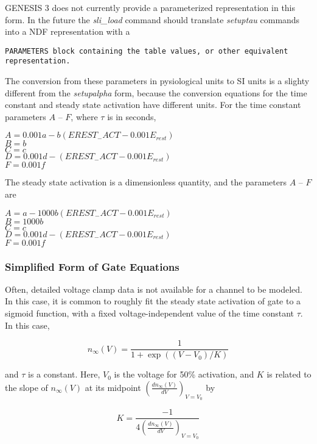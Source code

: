 \documentclass[12pt]{article}
\begin{document}
GENESIS 3 does not currently provide a parameterized representation in
this form.  In the future the {\em sli\_load} command should  translate
{\em setuptau} commands into a NDF representation with a {\tt PARAMETERS
block containing the table values, or other equivalent representation.

The conversion from these parameters in pysiological units to SI units
is a slighty different from the {\em setupalpha} form, because the
conversion equations for the time constant and steady state activation
have different units.   For the time constant parameters $A$ -- $F$,
where $\tau$ is in seconds,

$A = 0.001 a - b (EREST_{-}ACT - 0.001 E_{rest})$ \\
$B = b$ \\
$C = c$ \\
$D = 0.001 d - (EREST_{-}ACT - 0.001 E_{rest})$ \\
$F = 0.001 f$

The steady state activation is a dimensionless quantity, and the
parameters $A$ -- $F$ are

$A = a - 1000 b (EREST_{-}ACT - 0.001 E_{rest})$ \\
$B = 1000 b$ \\
$C = c$ \\
$D = 0.001 d - (EREST_{-}ACT - 0.001 E_{rest})$ \\
$F = 0.001 f$

\subsubsection{Simplified Form of Gate Equations}

Often, detailed voltage clamp data is not available for a channel to be
modeled.  In this case, it is common to roughly fit the steady state
activation of gate to a sigmoid function, with a fixed
voltage-independent value of the time constant $\tau$.  In this case,

\begin{equation}
n_\infty(V) = \frac{ 1 }{ 1 + \exp((V - V_{0}) / K) }
\label{eq13}
\end{equation}

and $\tau$ is a constant.  Here, $V_{0}$ is the voltage for 50\% activation,
and $K$ is related to the slope of $n_\infty(V)$ at its midpoint 
$(\frac{d n_\infty(V)}{d V})_{V=V_0}$ by

\begin{equation}
K =  \frac{ -1 }{ 4 (\frac{d n_\infty(V)}{d V})_{V=V_0} }
\label{eq14}
\end{equation}

}
\end{document}
